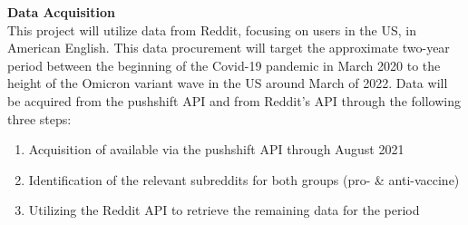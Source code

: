 \documentclass{article}
\begin{document}
    {\raggedleft\textbf{Data Acquisition}} \\
    This project will utilize data from Reddit, focusing on users in the US, in American English. 
    This data procurement will target the approximate two-year period between the beginning of the Covid-19 pandemic in March 2020 to the height of the Omicron variant wave in the US around March of 2022.
    Data will be acquired from the pushshift API and from Reddit’s API through the following three steps: \\
    \begin{enumerate}
        \item Acquisition of available via the pushshift API through August 2021
        \item Identification of the relevant subreddits for both groups (pro- \& anti-vaccine)
        \item Utilizing the Reddit API to retrieve the remaining data for the period
    \end{enumerate}
\end{document}
